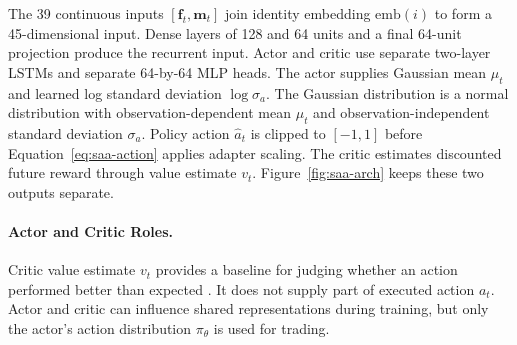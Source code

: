 The 39 continuous inputs \([\mathbf f_t,\mathbf m_t]\) join identity embedding \(\mathrm{emb}(i)\) to form a 45-dimensional input. Dense layers of 128 and 64 units and a final 64-unit projection produce the recurrent input. Actor and critic use separate two-layer LSTMs and separate 64-by-64 MLP heads. The actor supplies Gaussian mean \(\mu_t\) and learned log standard deviation \(\log\sigma_a\). The Gaussian distribution is a normal distribution with observation-dependent mean \(\mu_t\) and observation-independent standard deviation \(\sigma_a\). Policy action \(\hat a_t\) is clipped to \([-1,1]\) before Equation~\eqref{eq:saa-action} applies adapter scaling. The critic estimates discounted future reward through value estimate \(v_t\). Figure~\ref{fig:saa-arch} keeps these two outputs separate.

\paragraph{Actor and Critic Roles.}
\label{sec:actor-critic-theory}
Critic value estimate \(v_t\) provides a baseline for judging whether an action performed better than expected \cite{SuttonBarto}. It does not supply part of executed action \(a_t\). Actor and critic can influence shared representations during training, but only the actor's action distribution \(\pi_\theta\) is used for trading.





